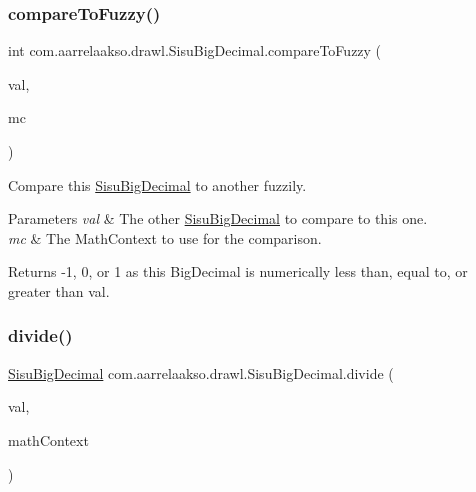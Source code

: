 \subsubsection{\texorpdfstring{compare\+To\+Fuzzy()}{compareToFuzzy()}\hspace{0.1cm}{\footnotesize\ttfamily [2/2]}}
{\footnotesize\ttfamily int com.\+aarrelaakso.\+drawl.\+Sisu\+Big\+Decimal.\+compare\+To\+Fuzzy (\begin{DoxyParamCaption}\item[{\hyperlink{classcom_1_1aarrelaakso_1_1drawl_1_1_sisu_big_decimal}{Sisu\+Big\+Decimal}}]{val,  }\item[{Math\+Context}]{mc }\end{DoxyParamCaption})\hspace{0.3cm}{\ttfamily [protected]}}



Compare this \hyperlink{classcom_1_1aarrelaakso_1_1drawl_1_1_sisu_big_decimal}{Sisu\+Big\+Decimal} to another fuzzily. 


\begin{DoxyParams}{Parameters}
{\em val} & The other \hyperlink{classcom_1_1aarrelaakso_1_1drawl_1_1_sisu_big_decimal}{Sisu\+Big\+Decimal} to compare to this one. \\
\hline
{\em mc} & The Math\+Context to use for the comparison. \\
\hline
\end{DoxyParams}
\begin{DoxyReturn}{Returns}
-\/1, 0, or 1 as this Big\+Decimal is numerically less than, equal to, or greater than val. 
\end{DoxyReturn}
\mbox{\label{classcom_1_1aarrelaakso_1_1drawl_1_1_sisu_big_decimal_ac1dbd016deb958fa7332bf3a777d14e2}} 
\subsubsection{\texorpdfstring{divide()}{divide()}\hspace{0.1cm}{\footnotesize\ttfamily [1/3]}}
{\footnotesize\ttfamily \hyperlink{classcom_1_1aarrelaakso_1_1drawl_1_1_sisu_big_decimal}{Sisu\+Big\+Decimal} com.\+aarrelaakso.\+drawl.\+Sisu\+Big\+Decimal.\+divide (\begin{DoxyParamCaption}\item[{\hyperlink{classcom_1_1aarrelaakso_1_1drawl_1_1_sisu_big_decimal}{Sisu\+Big\+Decimal}}]{val,  }\item[{Math\+Context}]{math\+Context }\end{DoxyParamCaption})\hspace{0.3cm}{\ttfamily [protected]}}

